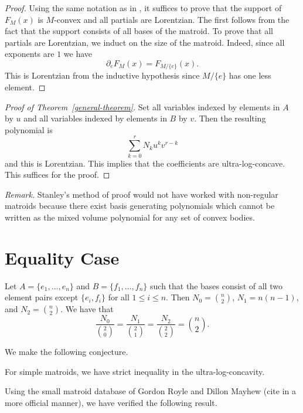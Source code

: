 \documentclass[12pt]{article}
\begin{document}
\begin{proof}
	Using the same notation as in \cite{lorentzian-polynomials}, it suffices to prove that the support of $F_M(x)$ is $M$-convex and all partials are Lorentzian. The first follows from the fact that the support consists of all bases of the matroid. To prove that all partials are Lorentzian, we induct on the size of the matroid. Indeed, since all exponents are $1$ we have 
	\[
		\partial_e F_M(x) = F_{M / \{e\}} (x).
	\]
	This is Lorentzian from the inductive hypothesis since $M / \{e\}$ has one less element. 
\end{proof}

\begin{proof}[Proof of Theorem~\ref{general-theorem}]
	Set all variables indexed by elements in $A$ by $u$ and all variables indexed by elements in $B$ by $v$. Then the resulting polynomial is 
	\[
		\sum_{k = 0}^r N_k u^k v^{r-k}
	\]
	and this is Lorentzian. This implies that the coefficients are ultra-log-concave. This suffices for the proof. 
\end{proof}

\textit{Remark.} Stanley's method of proof would not have worked with non-regular matroids because there exist basis generating polynomials which cannot be written as the mixed volume polynomial for any set of convex bodies.

\section{Equality Case}

\begin{example}
	Let $A = \{e_1, \ldots, e_n\}$ and $B = \{f_1, \ldots, f_n\}$ such that the bases consist of all two element pairs except $\{e_i, f_i\}$ for all $1 \leq i \leq n$. Then $N_0 = \binom{n}{2}$, $N_1 = n(n-1)$, and $N_2 = \binom{n}{2}$. We have that 
	\[
		\frac{N_0}{\binom{2}{0}} = \frac{N_1}{\binom{2}{1}} = \frac{N_2}{\binom{2}{2}} = \binom{n}{2}. 
	\]
\end{example}

We make the following conjecture. 

\begin{conj} \label{new-conjecture}
	For simple matroids, we have strict inequality in the ultra-log-concavity. 
\end{conj}

Using the small matroid database of Gordon Royle and Dillon Mayhew (cite in a more official manner), we have verified the following result. 
\end{document}
